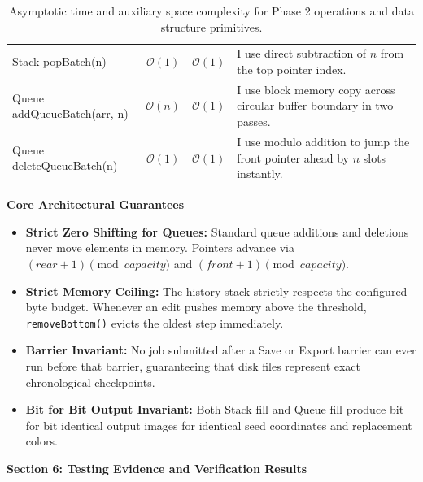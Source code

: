 \documentclass[10pt,a4paper]{article}
\begin{document}
\begin{table}[h!]
\begin{tabularx}{\textwidth}{l c c X}
\addlinespace[2pt]
Stack popBatch(n) & $\mathcal{O}(1)$ & $\mathcal{O}(1)$ & I use direct subtraction of $n$ from the top pointer index. \\
\addlinespace[2pt]
Queue addQueueBatch(arr, n) & $\mathcal{O}(n)$ & $\mathcal{O}(1)$ & I use block memory copy across circular buffer boundary in two passes. \\
\addlinespace[2pt]
Queue deleteQueueBatch(n) & $\mathcal{O}(1)$ & $\mathcal{O}(1)$ & I use modulo addition to jump the front pointer ahead by $n$ slots instantly. \\
\bottomrule
\end{tabularx}
\caption{Asymptotic time and auxiliary space complexity for Phase 2 operations and data structure primitives.}
\end{table}

\begin{center}
    {\large \textbf{Core Architectural Guarantees}}
\end{center}
\begin{itemize}[leftmargin=1.2em,noitemsep,topsep=2pt,parsep=1pt]
    \item \textbf{Strict Zero Shifting for Queues:} Standard queue additions and deletions never move elements in memory. Pointers advance via $(rear + 1) \pmod{capacity}$ and $(front + 1) \pmod{capacity}$.
    \item \textbf{Strict Memory Ceiling:} The history stack strictly respects the configured byte budget. Whenever an edit pushes memory above the threshold, \texttt{removeBottom()} evicts the oldest step immediately.
    \item \textbf{Barrier Invariant:} No job submitted after a Save or Export barrier can ever run before that barrier, guaranteeing that disk files represent exact chronological checkpoints.
    \item \textbf{Bit for Bit Output Invariant:} Both Stack fill and Queue fill produce bit for bit identical output images for identical seed coordinates and replacement colors.
\end{itemize}

\clearpage


\begin{center}
    {\Large \textbf{Section 6: Testing Evidence and Verification Results}}
\end{center}
\end{document}
